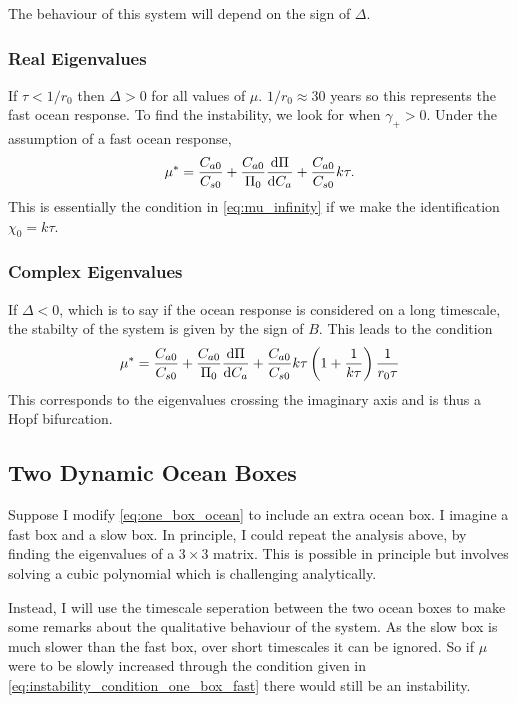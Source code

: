 The behaviour of this system will depend on the sign of $\Delta$.

\subsubsection{Real Eigenvalues}
If $\tau < 1/r_0$ then $\Delta > 0$ for all values of $\mu$. $1/r_0 \approx 30$ years so this represents the fast ocean response.
To find the instability, we look for when $\gamma_+ > 0$. Under the assumption of a fast ocean response,
\begin{equation}
  \label{eq:instability_condition_one_box_fast}
  \mu^* = \frac{C_{a0}}{C_{s0}} + \frac{C_{a0}}{\Pi_0} \dv{\Pi}{C_a} + \frac{C_{a0}}{C_{s0}} k\tau.
\end{equation}
This is essentially the condition in \cref{eq:mu_infinity} if we make the identification $\chi_0 = k \tau$.
\subsubsection{Complex Eigenvalues}
If $\Delta < 0$, which is to say if the ocean response is considered on a long timescale, the stabilty of the system is given by the sign of $B$.
This leads to the condition
\begin{equation}
  \label{eq:instability_condition_one_box_slow}
  \mu^* =\frac{C_{a0}}{C_{s0}} + \frac{C_{a0}}{\Pi_0} \dv{\Pi}{C_a} + \frac{C_{a0}}{C_{s0}} k\tau\left(
     1 + \frac{1}{k\tau}
  \right) \frac{1}{r_0\tau}
\end{equation}
This corresponds to the eigenvalues crossing the imaginary axis and is thus a Hopf bifurcation.
\subsection{Two Dynamic Ocean Boxes}
Suppose I modify \cref{eq:one_box_ocean} to include an extra ocean box. I imagine a fast box and a slow box. In principle, I could repeat the
analysis above, by finding the eigenvalues of a $3 \times 3$ matrix. This is possible in principle but involves solving a cubic polynomial which
is challenging analytically.

Instead, I will use the timescale seperation between the two ocean boxes to make some remarks about the qualitative behaviour of the system.
As the slow box is much slower than the fast box, over short timescales it can be ignored. So if $\mu$ were to be slowly increased through
the condition given in \cref{eq:instability_condition_one_box_fast} there would still be an instability.


